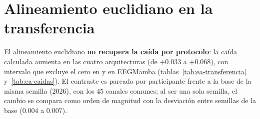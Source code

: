 \section{Alineamiento euclidiano en la transferencia}
\label{sec:ea-transferencia}

El alineamiento euclidiano \textbf{no recupera la caída por protocolo}: la caída calculada aumenta en las
cuatro arquitecturas (de $+0.033$ a $+0.068$), con intervalo que excluye el cero en \eegnet{} y en EEGMamba
(tablas~\ref{tab:ea-transferencia} y~\ref{tab:ea-caidas}). El contraste es pareado por participante frente a
la base de la misma semilla ($2026$), con los $45$ canales comunes; al ser una sola semilla, el cambio se
compara como orden de magnitud con la desviación entre semillas de la base ($0.004$ a $0.007$).

\begin{table}[H]
\centering
\caption{Variante con alineamiento euclidiano menos la base de la misma semilla ($2026$), por evaluación:
modelo de $54$ sujetos evaluado en WBCIC-SHU, y modelo de $44$ sujetos evaluado en WBCIC-SHU y en los $10$
sujetos apartados. $p_{\text{Holm}}$ sobre los doce contrastes.}
\label{tab:ea-transferencia}
\footnotesize
{}
\end{table}

